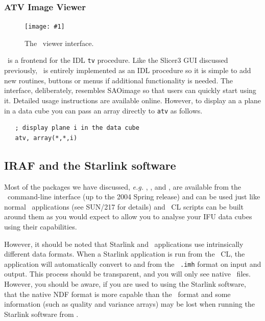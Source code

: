 \documentclass[twoside,11pt]{article}
\newcommand{\htmladdnormallink}[2]{#1}
\newcommand{\htmladdimg}[1]{}
\newcommand{\xref}[3]{#1}
\newcommand{\xlabel}[1]{}
\newcommand{\myfig} [5] {
  \begin{figure}
    \centering\texttt{[image: \#1]}
    \typeout{#1 inserted on page \arabic{page}}
    \caption{\label{#4}#5}
  \end{figure}
  }
\newcommand{\myfig}[5]{
    \label{#4} \htmladdimg{#3}\\
    Figure: #5\\
    }
\begin{document}
\begin{\htmlonly}
{\subsubsection{ATV Image Viewer}

\myfig{sc16_atv.eps}{height=0.4\textheight}{sc16_atv.gif}{sc16_atv_fig}{The
\ATV\ viewer interface.} 

\htmladdnormallink{\ATV}{http://www.physics.uci.edu/~barth/atv/}
\normalsize\  is a
frontend for the IDL {\tt tv} procedure.  Like the Slicer3 GUI
discussed previously, \ATV\ is entirely implemented as an IDL
\htmladdnormallink{procedure}{http://www.physics.uci.edu/~barth/atv/atv.pro}
so it is simple to add new routines, buttons or menus if additional
functionality is needed.  The interface, deliberately, resembles
SAOimage so that users can quickly start using it.  Detailed usage
\htmladdnormallink{instructions}{http://www.physics.uci.edu/~barth/atv/instructions.html}
are available online.  However,
to display an a plane in a data cube you can pass an array directly to
{\tt atv} as follows.

\small\begin{verbatim}
   ; display plane i in the data cube
   atv, array(*,*,i)
\end{verbatim}\normalsize

\subsection{\xlabel{sc16_irafstar}IRAF and the Starlink software\label{sc16_irafstar}}

Most of the packages we have discussed, \emph{e.g.} \KAPPAref,
\FIGAROref, and \CCDPACKref, are available from the \IRAFref\ command-line
interface (up to the 2004 Spring release) and can be used just like
normal \IRAF\ applications (see \xref{SUN/217}{sun217}{} for details)
and \IRAF\ CL scripts can be built around them as you would expect to
allow you to analyse your IFU data cubes using their capabilities.

However, it should be noted that Starlink and \IRAF\ applications use
intrinsically different data formats.  When a Starlink application is
run from the \IRAF\ CL, the application will automatically convert to
and from the \IRAF\ {\tt .imh} format on input and output.  This process
should be transparent, and you will only see native \IRAF\ files.
However, you should be aware, if you are used to using the Starlink
software, that the native \xref{NDF}{sun33}{} format is more capable
than the \IRAF\ format and some information (such as quality and
variance arrays) may be lost when running the Starlink software from
\IRAF.

}
\end{\htmlonly}
\end{document}
